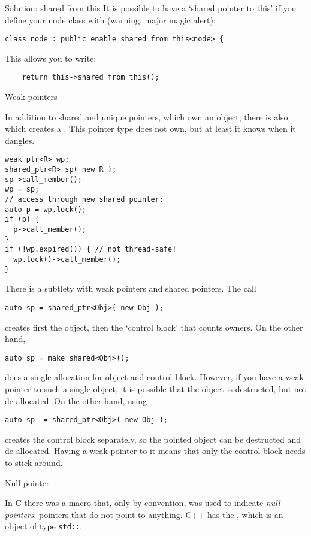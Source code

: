 \begin{slide}{Solution: shared from this}
  \label{sl:share-ptr-node-from}
  It is possible to have a `shared pointer to this' if you
  define your node class with (warning, major magic alert):
\begin{lstlisting}
class node : public enable_shared_from_this<node> {
\end{lstlisting}
This allows you to write:
\begin{lstlisting}
    return this->shared_from_this();
\end{lstlisting}
\end{slide}

 {Weak pointers}
\label{sec:weak_ptr}

In addition to shared and unique pointers, which own an object, there
is also  which creates a
. This pointer type does not own, but
at least it knows when it dangles.

\begin{lstlisting}
weak_ptr<R> wp;
shared_ptr<R> sp( new R );
sp->call_member();
wp = sp;
// access through new shared pointer:
auto p = wp.lock();
if (p) {
  p->call_member();
}
if (!wp.expired()) { // not thread-safe!
  wp.lock()->call_member();
}
\end{lstlisting}

There is a subtlety with weak pointers and shared pointers. The call
\begin{lstlisting}
auto sp = shared_ptr<Obj>( new Obj );
\end{lstlisting}
creates first the object, then the `control block' that counts owners.
On the other hand,
\begin{lstlisting}
auto sp = make_shared<Obj>();
\end{lstlisting}
does a single allocation for object and control block. However, if you
have a weak pointer to such a single object, it is possible that the
object is destructed, but not de-allocated. On the other hand, using
\begin{lstlisting}
auto sp  = shared_ptr<Obj>( new Obj );
\end{lstlisting}
creates the control block separately, so the pointed object can be
destructed and de-allocated. Having a weak pointer to it means that only
the control block needs to stick around.

 {Null pointer}

In C there was a macro  that, only by convention, was
used to indicate
\emph{null pointers}:
pointers that do not point to anything.
C++ has the , which is an object of type
\lstinline{std::}.

